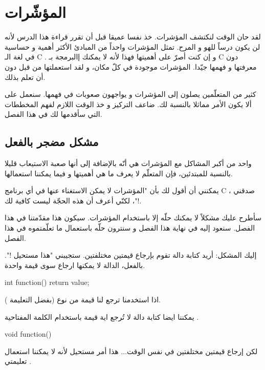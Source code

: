 \chapter{المؤشّرات}
لقد حان الوقت لنكتشف المؤشرات. خذ نفسا عميقا قبل أن تقرر قراءة هذا الدرس لأنه لن يكون درساً للهو و المرح. تمثل المؤشرات واحداً من المبادئ الأكثر أهمية و حساسية في لغة الـ
\textenglish{C}
. و إن كنت أصرّ على أهميتها فهذا  لأنه لا يمكنك إالبرمجة بـ
\textenglish{C}
دون معرفتها و فهمها جيّدا. المؤشرات موجودة في كلّ مكان، و لقد استعملتها من قبل دون أن تعلم بذلك.

كثير من المتعلّمين يصلون إلى المؤشرات و يواجهون صعوبات في فهمها. سنعمل على ألا يكون الأمر مماثلا بالنسبة لك. ضاعف التركيز و خذ الوقت اللازم لفهم المخططات التي سأقدمها لك في هذا الفصل.

\section{مشكل مضجر بالفعل}
واحد من أكبر المشاكل مع المؤشرات هي أنّه بالإضافة إلى أنها صعبة الاستيعاب قليلا بالنسبة للمبتدئين، فإن المتعلّم لا يعرف ما هي أهميتها و فيما يمكننا استعمالها.

يمكنني أن أقول لك بأن "المؤشرات لا يمكن الاستغناء عنها في أي برنامج
\textenglish{C}
، صدقني !"، لكنّي أعرف أن هذه الحجّة ليست كافية لك.

سأطرح عليك مشكلاً لا يمكنك حلّه إلا باستخدام المؤشرات. سيكون هذا مقدّمتنا في هذا الفصل. سنعود إليه في نهاية هذا الفصل و سنترون حلّه باستعمال ما تعلّمتموه في هذا الفصل.

إليك المشكل: أريد كتابة دالة تقوم بإرجاع قيمتين مختلفتين. ستجيبني "هذا مستحيل !". بالفعل، الدالة لا يمكنها ارجاع سوى قيمة واحدة.
\begin{Csource}
int function()
{
	return value;
}
\end{Csource}
اذا استخدمنا
ترجع لنا قيمة من نوع
(بفضل التعليمة
).

يمكننا ايضا كتابة دالة لا تُرجع اية قيمة باستخدام الكلمة المفتاحية
.
\begin{Csource}
void function()
{

}
\end{Csource}
لكن إرجاع قيمتين مختلفتين في نفس الوقت... هذا أمر مستحيل لأنه لا يمكننا استعمال تعليمتي
.

